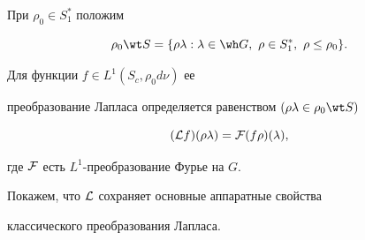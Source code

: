 При $\rho_0\in S_1^*$ положим


$$


\rho_0\wt S=\{\rho\lambda:\lambda\in \wh G,\ \rho\in S_1^*,\ \rho\leq


\rho_0\}.


$$





\begin{defn}


Для функции $f\in L^1(S_c,\rho_0d\nu)$ ее


преобразование Лапласа определяется равенством $(\rho\lambda\in


\rho_0\wt S)$


\begin{equation}


({\cal L}f)(\rho\lambda) = {\cal F}(f\rho)(\lambda),


\end{equation}


где ${\cal F}$ есть $L^1$-преобразование Фурье на $G$.


\end{defn}





Покажем, что ${\cal L}$ сохраняет основные аппаратные свойства


классического преобразования Лапласа.





